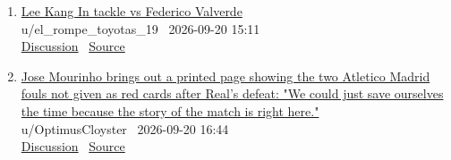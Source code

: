 \documentclass[11pt,a4paper]{article}
\begin{document}
\begin{enumerate}
  \item \href{https://www.reddit.com/r/soccer/comments/1wljl7m/lee_kang_in_tackle_vs_federico_valverde/}{Lee Kang In tackle vs Federico Valverde}\\ {\small u/el\_rompe\_toyotas\_19 \textbullet\ 2026-09-20 15:11}\\ {\small \href{https://www.reddit.com/r/soccer/comments/1wljl7m/lee_kang_in_tackle_vs_federico_valverde/}{Discussion} \textbullet\ \href{https://v.redd.it/cpk32zffyoqh1}{Source}}
  \item \href{https://www.reddit.com/r/soccer/comments/1wlm06y/jose_mourinho_brings_out_a_printed_page_showing/}{Jose Mourinho brings out a printed page showing the two Atletico Madrid fouls not given as red cards after Real's defeat: "We could just save ourselves the time because the story of the match is right here."}\\ {\small u/OptimusCloyster \textbullet\ 2026-09-20 16:44}\\ {\small \href{https://www.reddit.com/r/soccer/comments/1wlm06y/jose_mourinho_brings_out_a_printed_page_showing/}{Discussion} \textbullet\ \href{https://v.redd.it/9nrnrp12fpqh1}{Source}}
\end{enumerate}
\end{document}
